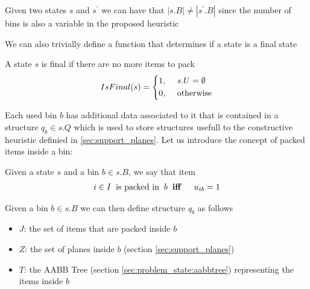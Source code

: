 \begin{observation}
    Given two states $s$ and $s^\prime$ we can have that $|s.B| \neq |s^\prime.B|$ since the number of bins is also a variable in the proposed heuristic
\end{observation}

We can also trivially define a function that determines if a state is a final state
\begin{definition}
    \label{def:state_final}
    A state $s$ is final if there are no more items to pack
    \begin{equation}
        \label{algo:state_final}%
        IsFinal(s) = \left\{\begin{aligned}
            1,\hspace{0.5cm}& s.U = \emptyset \\
            0,\hspace{0.5cm}& \text{otherwise}
        \end{aligned}
        \right.
    \end{equation}
\end{definition}

Each used bin $b$ has additional data associated to it that is contained in a structure $q_b \in s.Q$ which is used to store structures usefull to the constructive heuristic definied in \cref{sec:support_planes}. 
Let us introduce the concept of packed items inside a bin:
\begin{definition}
    Given a state $s$ and a bin $b \in s.B$, we say that item
    \begin{equation*}
        \begin{aligned}
            i \in I \hspace{.2cm}\text{is packed in} \hspace{.2cm}b \hspace{.2cm}& \textbf{iff} \hspace{.2cm}& u_{ib} = 1
        \end{aligned}
    \end{equation*}
\end{definition}

Given a bin $b \in s.B$ we can then define structure $q_b$ as follows
\begin{itemize}
    \item $J$: the set of items that are packed inside $b$
    \item $Z$: the set of planes inside $b$ (section \ref{sec:support_planes})
    \item $T$: the AABB Tree (section \ref{sec:problem_state:aabbtree}) representing the items inside $b$
\end{itemize}

